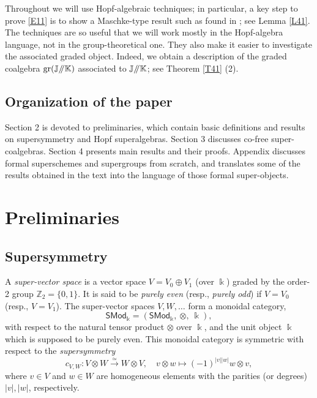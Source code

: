 \documentclass[11pt, a4paper]{amsart}
\theoremstyle{definition}
\numberwithin{equation}{section}
\begin{document}
Throughout we will use Hopf-algebraic techniques; in particular, a key step to prove \eqref{E11} is 
to show a Maschke-type result such as found in \cite{D}; see Lemma \ref{L41}.  The techniques
are so useful that we will work mostly in the Hopf-algebra language, not in the group-theoretical one. 
They also make it easier to investigate the associated graded object. Indeed, we obtain a description 
of the graded coalgebra $\operatorname{gr}(\mathbb{J}/\hspace{-1mm}/\mathbb{K})$
associated to $\mathbb{J}/\hspace{-1mm}/\mathbb{K}$; see Theorem \ref{T41} (2). 

\subsection{Organization of the paper}
Section 2 is devoted to preliminaries, which contain basic definitions and results on supersymmetry
and Hopf superalgebras. 
Section 3 discusses co-free super-coalgebras. Section 4 presents main results and their proofs. 
Appendix discusses formal superschemes and supergroups from scratch, and translates some of the
results obtained in the text into the language of those formal super-objects. 

\section{Preliminaries}\label{Sec2}


\subsection{Supersymmetry}\label{Subsec2.1}
A \emph{super-vector space} is a vector space $V=V_{0} \oplus V_{1}$ (over $\Bbbk$) graded by the order-2 group $\mathbb{Z}_{2}=\{ 0, 1 \}$.
It is said to be \emph{purely even} (resp., \emph{purely odd}) if $V=V_{0}$ (resp., $V=V_{1}$).
The super-vector spaces $V, W, \dots$ form a monoidal category,
\[ \mathsf{SMod}_{\Bbbk} = (\mathsf{SMod}_{\Bbbk},\ \otimes,\ \Bbbk), \]
with respect to the natural tensor product $\otimes$ over $\Bbbk$, and the unit object $\Bbbk$ which is supposed to be purely even.
This monoidal category is symmetric with respect to the \emph{supersymmetry}
\begin{equation}\label{E21}
c_{V, W}: V \otimes W \overset{\simeq}{\longrightarrow} W \otimes V,\quad v \otimes w \mapsto (-1)^{|v| |w|} w \otimes v,
\end{equation}
where $v \in V$ and $w \in W$ are homogeneous elements with the parities (or degrees) $|v|, |w|$, respectively.
\end{document}
